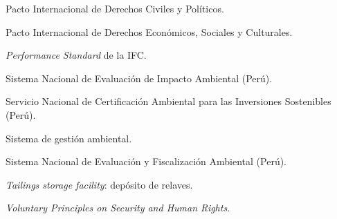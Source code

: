 \begin{description}[leftmargin=2.6cm,style=sameline,font=\bfseries]
  \item[PIDCP] Pacto Internacional de Derechos Civiles y Políticos.
  \item[PIDESC] Pacto Internacional de Derechos Económicos, Sociales y Culturales.
  \item[PS] \textit{Performance Standard} de la IFC.
  \item[SEIA] Sistema Nacional de Evaluación de Impacto Ambiental (Perú).
  \item[SENACE] Servicio Nacional de Certificación Ambiental para las Inversiones
        Sostenibles (Perú).
  \item[SGA] Sistema de gestión ambiental.
  \item[SINEFA] Sistema Nacional de Evaluación y Fiscalización Ambiental (Perú).
  \item[TSF] \textit{Tailings storage facility}: depósito de relaves.
  \item[VPSHR] \textit{Voluntary Principles on Security and Human Rights}.
\end{description}
